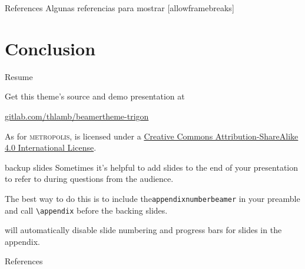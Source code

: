 \begin{frame}{References}
  Algunas referencias para mostrar [allowframebreaks] \cite{knuth92,ConcreteMath,Simpson,Er01,greenwade93}
\end{frame}

\section{Conclusion}
\begin{frame}{Resume}

  Get this theme's source and demo presentation at

  \begin{center}\url{gitlab.com/thlamb/beamertheme-trigon}\end{center}

  As for \textsc{metropolis}, \themename is licensed under a
  \href{http://creativecommons.org/licenses/by-sa/4.0/}{Creative Commons
  Attribution-ShareAlike 4.0 International License}.

  \begin{center}\ccbysa\end{center}

\end{frame}


\appendix

\begin{frame}[fragile]{backup slides}
  Sometimes it's helpful to add slides to the end of your presentation to refer to during questions from the audience.

  The best way to do this is to include the\verb|appendixnumberbeamer|
  in your preamble and call \verb|\appendix| before the backing slides.

  \themename will automatically disable slide numbering and progress bars for slides in the appendix.
\end{frame}

\begin{frame}[allowframebreaks]{References}

  
  

\end{frame}
